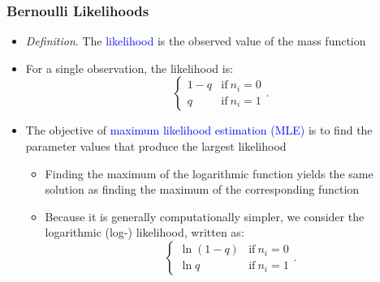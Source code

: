 \documentclass{beamer}
\begin{document}
\begin{frame}[shrink=2]
 \frametitle{Bernoulli Likelihoods}
\begin{itemize}
\item \textit{Definition}. The \textcolor{blue}{likelihood} is the observed value of the mass
function \vspace{2mm}
\item For a single observation, the likelihood is:
\begin{equation*}
\left\{
\begin{array}{ll}
1-q & \mathrm{if}\ n_i=0 \\
q   & \mathrm{if}\ n_i=1
\end{array}
\right. .
\end{equation*} \vspace{2mm}
\item The objective of \textcolor{blue}{maximum likelihood estimation (MLE)} is to find the parameter values that produce the largest
likelihood \vspace{2mm}
\begin{itemize}
\item Finding the maximum of the logarithmic function yields the same solution as finding the maximum of the corresponding
function \vspace{2mm}
\item Because it is generally computationally simpler, we consider the logarithmic (log-) likelihood, written
as:
\begin{equation*}
\left\{
\begin{array}{ll}
\ln \left( 1-q\right)  & \mathrm{if}\ n_i=0 \\
\ln     q              & \mathrm{if}\ n_i=1
\end{array}\right. .
\end{equation*}
\end{itemize}
\end{itemize}
\end{frame}
\end{document}
